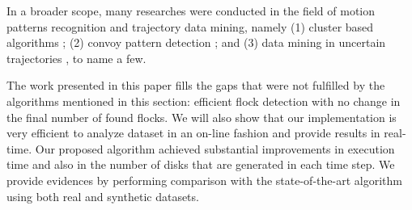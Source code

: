 In a broader scope, many researches were conducted in the field of motion patterns recognition and trajectory data
mining, namely (1) cluster based algorithms
\citep{clusters1}\citep{movingclusters}\citep{clusters2}\citep{clusters3}; (2) convoy pattern detection
\citep{convoy}\citep{flockpedestrian}\citep{convoy2}\citep{convoy3}; and (3) data mining in uncertain
trajectories \citep{uncertain1}\citep{uncertain2}\citep{uncertain3}\citep{uncertain4}, to name a few.

The work presented in this paper fills the gaps that were not fulfilled by the algorithms mentioned in this section:
efficient flock detection with no change in the final number of found flocks. We will also show that our implementation
is very efficient to analyze dataset in an on-line fashion and provide results in real-time. Our proposed algorithm
achieved substantial improvements in execution time and also in the number of disks that are generated in each time
step. We provide evidences by performing comparison with the state-of-the-art algorithm using both real and synthetic
datasets.
